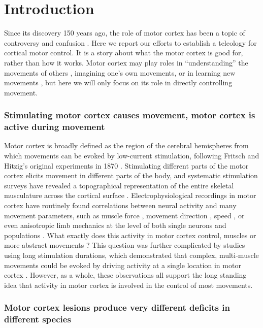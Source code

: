 \section{Introduction}

Since its discovery 150 years ago, the role of motor cortex has been a topic of controversy and confusion \cite{Lashley1924}. Here we report our efforts to establish a teleology for cortical motor control. It is a story about what the motor cortex is good for, rather than how it works. Motor cortex may play roles in ``understanding'' the movements of others \cite{Rizzolatti2004}, imagining one's own movements, or in learning new movements \cite{Kawai2015}, but here we will only focus on its role in directly controlling movement.

\subsubsection*{Stimulating motor cortex causes movement, motor cortex is active during movement}

Motor cortex is broadly defined as the region of the cerebral hemispheres from which movements can be evoked by low-current stimulation, following Fritsch and Hitzig's original experiments in 1870 \cite{Fritsch1870}. Stimulating different parts of the motor cortex elicits movement in different parts of the body, and systematic stimulation surveys have revealed a topographical representation of the entire skeletal musculature across the cortical surface \cite{Leyton1917, Penfield1937, Neafsey1986}. Electrophysiological recordings in motor cortex have routinely found correlations between neural activity and many movement parameters, such as muscle force \cite{Evarts1968}, movement direction \cite{Georgopoulos1986}, speed \cite{Schwartz1993} , or even anisotropic limb mechanics \cite{Scott2001} at the level of both single neurons \cite{Evarts1968,Churchland2007} and populations \cite{Georgopoulos1986,Churchland2012}. What exactly does this activity in motor cortex control, muscles or more abstract movements \cite{Todorov2000}? This question was further complicated by studies using long stimulation durations, which demonstrated that complex, multi-muscle movements could be evoked by driving activity at a single location in motor cortex \cite{Graziano2002,Aflalo2006}. However, as a whole, these observations all support the long standing idea that activity in motor cortex is involved in the control of most movements.

\subsubsection*{Motor cortex lesions produce very different deficits in different species}

